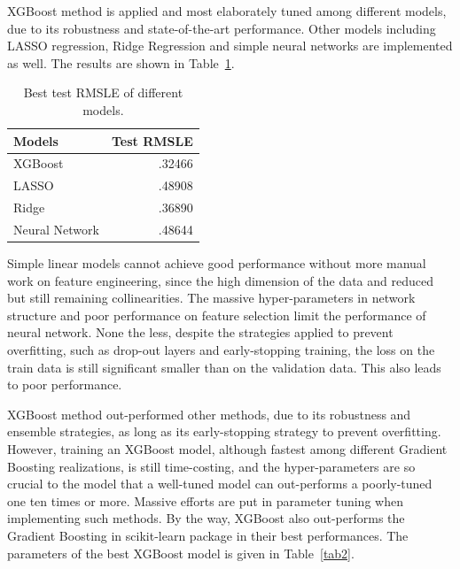 \documentclass{article}
\begin{document}
XGBoost method is applied and most elaborately tuned among different models, due to its robustness and state-of-the-art performance. Other models including LASSO regression, Ridge Regression and simple neural networks are implemented as well. The results are shown in Table~\ref{tab1}.

\begin{table}[t]
\caption{Best test RMSLE of different models. }
\label{tab1}
\vskip 0.15in
\begin{center}
\begin{small}
\begin{sc}
\begin{tabular}{lr}
\toprule
Models & Test RMSLE  \\
\midrule
XGBoost & .32466 \\
LASSO & .48908 \\
Ridge & .36890  \\
Neural Network & .48644 \\
\bottomrule
\end{tabular}
\end{sc}
\end{small}
\end{center}
\vskip -0.1in
\end{table}

Simple linear models cannot achieve good performance without more manual work on feature engineering, since the high dimension of the data and reduced but still remaining collinearities. The massive hyper-parameters in network structure and poor performance on feature selection limit the performance of neural network. None the less, despite the strategies applied to prevent overfitting, such as drop-out layers and early-stopping training, the loss on the train data is still significant smaller than on the validation data. This also leads to poor performance.

XGBoost method out-performed other methods, due to its robustness and ensemble strategies, as long as its early-stopping strategy to prevent overfitting. However, training an XGBoost model, although fastest among different Gradient Boosting realizations, is still time-costing, and the hyper-parameters are so crucial to the model that a well-tuned model can out-performs a poorly-tuned one ten times or more. Massive efforts are put in parameter tuning when implementing such methods. By the way, XGBoost also out-performs the Gradient Boosting in scikit-learn package\cite{sklearn} in their best performances. The parameters of the best XGBoost model is given in Table~\ref{tab2}.
\end{document}
